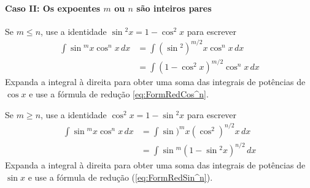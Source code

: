 \cleardoublepage\documentclass[../main.tex]{subfiles}
\begin{document}
\paragraph*{Caso II: Os expoentes \(m\) ou \(n\) são inteiros pares}
\begin{compactenum}[i.]
\item Se $m\leq n$, use a identidade $\sin\!\!^2 x = 1 - \cos^2 x$ para escrever
\begin{align}
    \int \sin\!\!^m x \cos^n x\, dx&=\int (\sin\!\!^2)^{m/2} x \cos^n x\, dx\nonumber\\
    &=\int (1 - \cos^2 x)^{m/2}\cos^n x\, dx
\end{align}
Expanda a integral à direita para obter uma soma das integrais de potências de $\cos x$ e use a fórmula de redução \eqref{eq:FormRedCos^n}.

\item Se $m\geq n$, use a identidade $\cos^2 x = 1 - \sin\!\!^2 x$ para escrever
\begin{align}
    \int \sin\!\!^m x \cos^n x\, dx&=\int \sin\!\!)^m x (\cos^2)^{n/2} x\, dx\nonumber\\
    &=\int \sin\!\!^m (1 - \sin\!\!^2 x)^{n/2}\, dx
\end{align}
Expanda a integral à direita para obter uma soma das integrais de potências de $\sin x$ e use a fórmula de redução (\ref{eq:FormRedSin^n}).
\end{compactenum}
\end{document}
